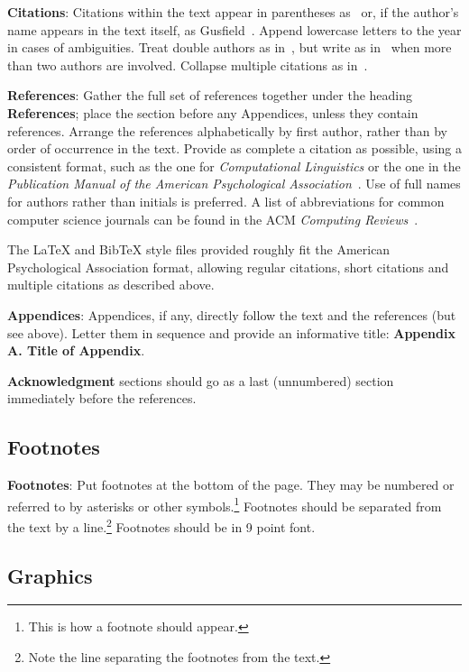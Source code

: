 \documentclass[11pt,letterpaper]{article}
\begin{document}
{\bf Citations}: Citations within the text appear
in parentheses as~\cite{Gusfield:97} or, if the author's name appears in
the text itself, as Gusfield~. 
Append lowercase letters to the year in cases of ambiguities.  
Treat double authors as in~\cite{Aho:72}, but write as 
in~\cite{Chandra:81} when more than two authors are involved. 
Collapse multiple citations as in~\cite{Gusfield:97,Aho:72}.

\textbf{References}: Gather the full set of references together under
the heading {\bf References}; place the section before any Appendices,
unless they contain references. Arrange the references alphabetically
by first author, rather than by order of occurrence in the text.
Provide as complete a citation as possible, using a consistent format,
such as the one for {\em Computational Linguistics\/} or the one in the 
{\em Publication Manual of the American 
Psychological Association\/}~\cite{APA:83}.  Use of full names for
authors rather than initials is preferred.  A list of abbreviations
for common computer science journals can be found in the ACM 
{\em Computing Reviews\/}~\cite{ACM:83}.

The \LaTeX{} and Bib\TeX{} style files provided roughly fit the
American Psychological Association format, allowing regular citations, 
short citations and multiple citations as described above.

{\bf Appendices}: Appendices, if any, directly follow the text and the
references (but see above).  Letter them in sequence and provide an
informative title: {\bf Appendix A. Title of Appendix}.

\textbf{Acknowledgment} sections should go as a last (unnumbered) section immediately
before the references.  

\subsection{Footnotes}

{\bf Footnotes}: Put footnotes at the bottom of the page. They may
be numbered or referred to by asterisks or other
symbols.\footnote{This is how a footnote should appear.} Footnotes
should be separated from the text by a line.\footnote{Note the
line separating the footnotes from the text.}  Footnotes should be in 9 point font.

\subsection{Graphics}
\end{document}
